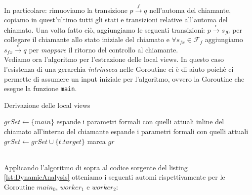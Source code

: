 In particolare: rimuoviamo la transizione $p \xrightarrow{f} q$ nell'automa del chiamante, copiamo in quest'ultimo tutti gli stati e transizioni relative all'automa del chiamato. Una volta fatto ciò, aggiungiamo le seguenti transizioni: $p \xrightarrow{\epsilon} s_{f0}$ per collegare il chiamante allo stato iniziale del chiamato e $\forall s_{fx} \in \mathcal{F}_f$ aggiungiamo $s_{fx} \xrightarrow{\epsilon} q$ per \emph{mappare} il ritorno del controllo al chiamante. \bigskip \\
Vediamo ora l'algoritmo per l'estrazione delle local views. In questo caso l'esistenza di una gerarchia \emph{intrinseca} nelle Goroutine ci è di aiuto poichè ci permette di assumere un input iniziale per l'algoritmo, ovvero la Goroutine che esegue la funzione \texttt{main}.
\begin{algorithm}
    \caption{Derivazione delle local views} \label{alg:Local_Views_Extraction}
    \begin{algorithmic}
        \State $grSet \gets \{ main \}$
         
         
        \State espande i parametri formali con quelli attuali
        \State inline del chiamato all'interno del chiamante
        \State espande i parametri formali con quelli attuali
        \State $grSet \gets grSet \cup \{ t.target \}$
        \EndIf
        \EndFor
        \State marca $gr$
        \EndWhile
    \end{algorithmic}
\end{algorithm}\\
Applicando l'algoritmo di sopra al codice sorgente del listing \ref{lst:DynamicAnalysis} otteniamo i seguenti automi rispettivamente per le Goroutine $main_0$, $worker_1$ e $worker_2$:
